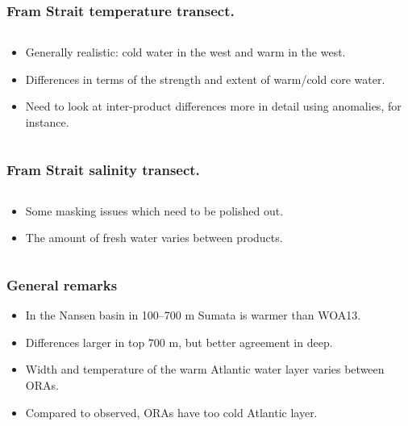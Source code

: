 \documentclass{beamer}
\begin{document}
  \begin{frame}
    \frametitle{Fram Strait temperature transect.}
    \begin{columns}
    \begin{column}{0.6\textwidth}
    \texttt{[image: \{fstransect\_T]}.png}
    \end{column}
    \begin{column}{0.4\textwidth}
    \begin{itemize}
    \item Generally realistic: cold water in the west and warm in the west.
    \item Differences in terms of the strength and extent of warm/cold core water.
    \item Need to look at inter-product differences more in detail using anomalies, for instance. 
    \end{itemize}
    \end{column}
    \end{columns}
  \end{frame}
  \begin{frame}
    \frametitle{Fram Strait salinity transect.}
    \begin{columns}
    \begin{column}{0.6\textwidth}
    \texttt{[image: \{fstransect\_S]}.png}
    \end{column}
    \begin{column}{0.4\textwidth}
    \begin{itemize}
    \item Some masking issues which need to be polished out.
    \item The amount of fresh water varies between products.
    \end{itemize}
    \end{column}
    \end{columns}
  \end{frame}
  \begin{frame}
    \frametitle{General remarks}
    \begin{itemize}
    \item In the Nansen basin in 100--700 m Sumata is warmer than WOA13.
    \item Differences larger in top 700 m, but better agreement in deep.
    \item Width and temperature of the warm Atlantic water layer varies between ORAs.
    \item Compared to observed, ORAs have too cold Atlantic layer.
    \end{itemize}
  \end{frame}
\end{document}
